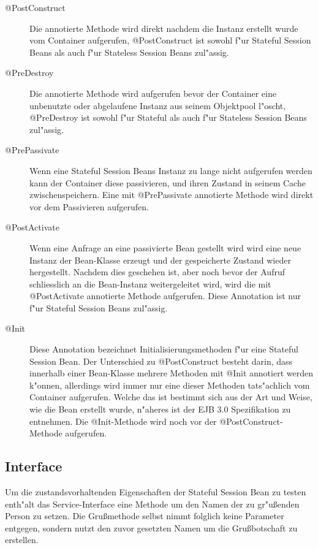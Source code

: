 \begin{description}
\item[@PostConstruct]
Die annotierte Methode wird direkt nachdem die Instanz erstellt wurde vom Container aufgerufen, @PostConstruct ist sowohl
f"ur Stateful Session Beans als auch f"ur Stateless Session Beans zul"assig.
\item[@PreDestroy]
Die annotierte Methode wird aufgerufen bevor der Container eine unbenutzte oder abgelaufene Instanz aus seinem Objektpool
l"oscht, @PreDestroy ist sowohl f"ur Stateful als auch f"ur Stateless Session Beans zul"assig.
\item[@PrePassivate]
Wenn eine Stateful Session Beans Instanz zu lange nicht aufgerufen werden kann der Container diese passivieren, und ihren
Zustand in seinem Cache zwischenspeichern. Eine mit @PrePassivate annotierte Methode wird direkt vor dem Passivieren aufgerufen.
\item[@PostActivate]
Wenn eine Anfrage an eine passivierte Bean gestellt wird wird eine neue Instanz der Bean-Klasse erzeugt und der gespeicherte
Zustand wieder hergestellt. Nachdem dies geschehen ist, aber noch bevor der Aufruf schliesslich an die Bean-Instanz weitergeleitet
wird, wird die mit @PostActivate annotierte Methode aufgerufen. Diese Annotation ist nur f"ur Stateful Session Beans zul"assig.
\item[@Init]
Diese Annotation bezeichnet Initialisierungsmethoden f"ur eine Stateful Session Bean. Der Unterschied zu @PostConstruct
besteht darin, dass innerhalb einer Bean-Klasse mehrere Methoden mit @Init annotiert werden k"onnen, allerdings wird immer nur
eine dieser Methoden tats"achlich vom Container aufgerufen. Welche das ist bestimmt sich aus der Art und Weise, wie die
Bean erstellt wurde, n"aheres ist der EJB 3.0 Spezifikation \cite{EJBHP} zu entnehmen. Die @Init-Methode wird noch vor der 
@PostConstruct-Methode aufgerufen.
\end{description}


\subsection{Interface}
\label{sec:chap2:sfsb:if}

Um die zustandsvorhaltenden Eigenschaften der Stateful Session Bean zu testen enth"alt das Service-Interface eine Methode 
um den Namen der zu gr"u\ss enden Person zu setzen. Die Gru\ss methode selbst nimmt folglich keine Parameter entgegen, sondern
nutzt den zuvor gesetzten Namen um die Gru\ss botschaft zu erstellen.

